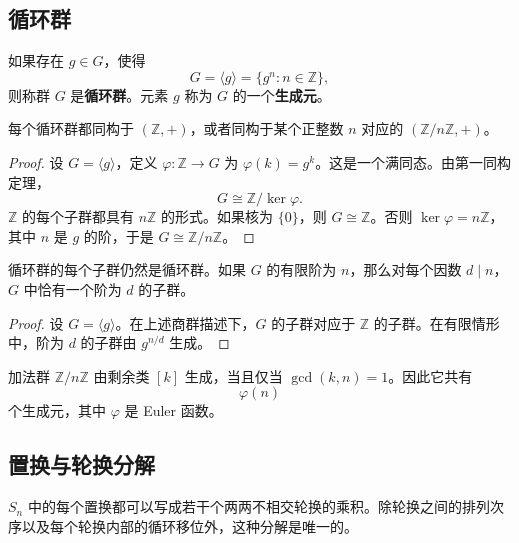 \subsection{循环群}

\begin{definition}[循环群]
如果存在 $g\in G$，使得
\[
    G=\langle g\rangle=\{g^n:n\in\mathbb{Z}\},
\]
则称群 $G$ 是\textbf{循环群}。元素 $g$ 称为 $G$ 的一个\textbf{生成元}。
\end{definition}

\begin{theorem}[循环群的分类]
每个循环群都同构于 $(\mathbb{Z},+)$，或者同构于某个正整数 $n$ 对应的 $(\mathbb{Z}/n\mathbb{Z},+)$。
\end{theorem}

\begin{proof}
设 $G=\langle g\rangle$，定义 $\varphi:\mathbb{Z}\to G$ 为 $\varphi(k)=g^k$。这是一个满同态。由第一同构定理，
\[
    G\cong\mathbb{Z}/\ker\varphi.
\]
$\mathbb{Z}$ 的每个子群都具有 $n\mathbb{Z}$ 的形式。如果核为 $\{0\}$，则 $G\cong\mathbb{Z}$。否则 $\ker\varphi=n\mathbb{Z}$，其中 $n$ 是 $g$ 的阶，于是 $G\cong\mathbb{Z}/n\mathbb{Z}$。
\end{proof}

\begin{corollary}
循环群的每个子群仍然是循环群。如果 $G$ 的有限阶为 $n$，那么对每个因数 $d\mid n$，$G$ 中恰有一个阶为 $d$ 的子群。
\end{corollary}

\begin{proof}
设 $G=\langle g\rangle$。在上述商群描述下，$G$ 的子群对应于 $\mathbb{Z}$ 的子群。在有限情形中，阶为 $d$ 的子群由 $g^{n/d}$ 生成。
\end{proof}

\begin{example}[有限循环群的生成元]
加法群 $\mathbb{Z}/n\mathbb{Z}$ 由剩余类 $[k]$ 生成，当且仅当 $\gcd(k,n)=1$。因此它共有
\[
    \varphi(n)
\]
个生成元，其中 $\varphi$ 是 Euler 函数。
\end{example}

\subsection{置换与轮换分解}

\begin{theorem}[不相交轮换分解]
$S_n$ 中的每个置换都可以写成若干个两两不相交轮换的乘积。除轮换之间的排列次序以及每个轮换内部的循环移位外，这种分解是唯一的。
\end{theorem}


